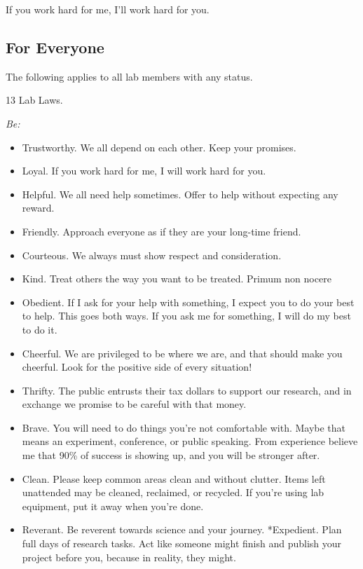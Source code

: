 \documentclass[
]{book}
\providecommand{\tightlist}{%
  \setlength{\itemsep}{0pt}\setlength{\parskip}{0pt}}
\begin{document}
If you work hard for me, I'll work hard for you.

\hypertarget{for-everyone}{%
\subsection{For Everyone}\label{for-everyone}}

The following applies to all lab members with any status.

13 Lab Laws.

\emph{Be:}

\begin{itemize}
\tightlist
\item
  Trustworthy. We all depend on each other. Keep your promises.
\item
  Loyal. If you work hard for me, I will work hard for you.
\item
  Helpful. We all need help sometimes. Offer to help without expecting any reward.
\item
  Friendly. Approach everyone as if they are your long-time friend.
\item
  Courteous. We always must show respect and consideration.\\
\item
  Kind. Treat others the way you want to be treated. Primum non nocere
\item
  Obedient. If I ask for your help with something, I expect you to do your best to help. This goes both ways. If you ask me for something, I will do my best to do it.
\item
  Cheerful. We are privileged to be where we are, and that should make you cheerful. Look for the positive side of every situation!
\item
  Thrifty. The public entrusts their tax dollars to support our research, and in exchange we promise to be careful with that money.
\item
  Brave. You will need to do things you're not comfortable with. Maybe that means an experiment, conference, or public speaking. From experience believe me that 90\% of success is showing up, and you will be stronger after.
\item
  Clean. Please keep common areas clean and without clutter. Items left unattended may be cleaned, reclaimed, or recycled. If you're using lab equipment, put it away when you're done.
\item
  Reverant. Be reverent towards science and your journey.
  *Expedient. Plan full days of research tasks. Act like someone might finish and publish your project before you, because in reality, they might.
\end{itemize}
\end{document}
